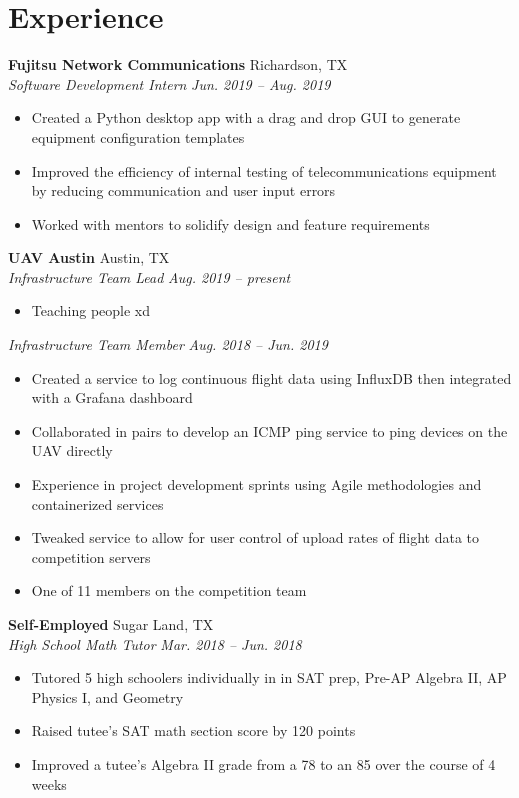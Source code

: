 \documentclass[letterpaper,11pt]{article}
\begin{document}
\section{Experience}
\textbf{Fujitsu Network Communications} \hfill Richardson, TX\\
\textit{Software Development Intern} \hfill \textit{Jun. 2019 -- Aug. 2019}\\
\begin{itemize}[noitemsep, topsep=0pt]
  \item Created a Python desktop app with a drag and drop GUI to generate equipment configuration templates
  \item Improved the efficiency of internal testing of telecommunications equipment by reducing communication and user 
  input errors %
  \item Worked with mentors to solidify design and feature requirements %
\end{itemize}
\textbf{UAV Austin} \hfill Austin, TX\\
\textit{Infrastructure Team Lead} \hfill \textit{Aug. 2019 -- present}\\
\begin{itemize}[noitemsep, topsep=0pt]
  \item Teaching people xd %
\end{itemize}
\textit{Infrastructure Team Member} \hfill \textit{Aug. 2018 -- Jun. 2019}\\
\begin{itemize}[noitemsep, topsep=0pt]
  \item Created a service to log continuous flight data using InfluxDB then integrated with a Grafana dashboard
  \item Collaborated in pairs to develop an ICMP ping service to ping devices on the UAV directly
  \item Experience in project development sprints using Agile methodologies and containerized services 
  \item Tweaked service to allow for user control of upload rates of flight data to competition servers %
  \item One of 11 members on the competition team %
\end{itemize}
\textbf{Self-Employed} \hfill Sugar Land, TX\\
\textit{High School Math Tutor} \hfill \textit{Mar. 2018 -- Jun. 2018}\\
\begin{itemize}[noitemsep, topsep=0pt]
  \item Tutored 5 high schoolers individually in in SAT prep, Pre-AP Algebra II, AP Physics I, and Geometry
  \item Raised tutee’s SAT math section score by 120 points
  \item Improved a tutee’s Algebra II grade from a 78 to an 85 over the course of 4 weeks
\end{itemize}
\end{document}
